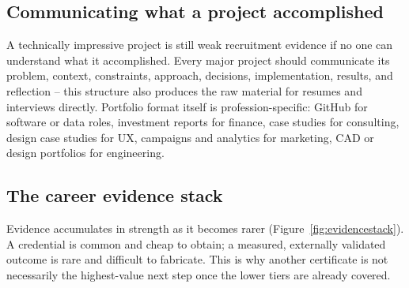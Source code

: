 \documentclass{reportkit}
\begin{document}
\begin{diagram}[
  type=network,
  caption={Project realism should escalate rather than accumulate.},
  label={fig:projects},
  source={Illustrative conceptual progression.},
  description={Five levels in sequence: guided, modified, independent, professionally realistic, externally validated.}
]
\end{diagram}

\subsection{Communicating what a project accomplished}
A technically impressive project is still weak recruitment evidence if no one can
understand what it accomplished. Every major project should communicate its problem,
context, constraints, approach, decisions, implementation, results, and reflection --
this structure also produces the raw material for resumes and interviews directly.
Portfolio format itself is profession-specific: GitHub for software or data roles,
investment reports for finance, case studies for consulting, design case studies for
UX, campaigns and analytics for marketing, CAD or design portfolios for engineering.

\subsection{The career evidence stack}
Evidence accumulates in strength as it becomes rarer (Figure~\ref{fig:evidencestack}).
A credential is common and cheap to obtain; a measured, externally validated outcome
is rare and difficult to fabricate. This is why another certificate is not necessarily
the highest-value next step once the lower tiers are already covered.
\end{document}
